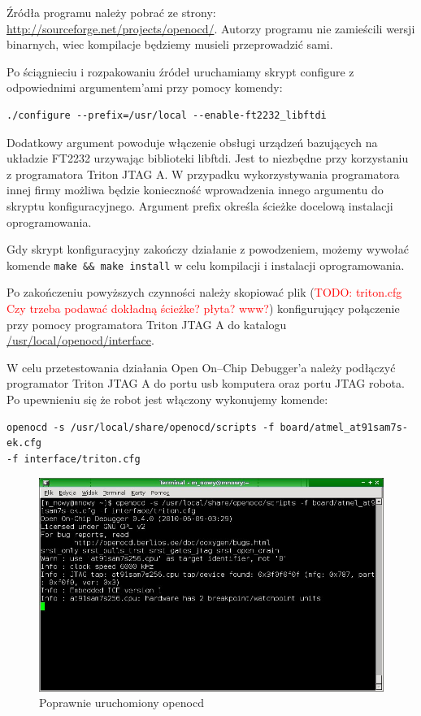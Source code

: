 Źródła programu należy pobrać ze strony:
\url{http://sourceforge.net/projects/openocd/}. Autorzy programu nie zamieścili
wersji binarnych, wiec kompilacje będziemy musieli przeprowadzić sami.

Po ściągnieciu i rozpakowaniu źródeł uruchamiamy skrypt configure z odpowiednimi
argumentem'ami przy pomocy komendy:

\begin{verbatim}
./configure --prefix=/usr/local --enable-ft2232_libftdi 
\end{verbatim}

Dodatkowy argument powoduje włączenie obsługi urządzeń bazujących na układzie
FT2232 urzywając biblioteki libftdi. Jest to niezbędne przy korzystaniu z
programatora Triton JTAG A. W przypadku wykorzystywania programatora innej firmy
możliwa będzie konieczność wprowadzenia innego argumentu do skryptu
konfiguracyjnego. Argument prefix określa ścieżke docelową instalacji
oprogramowania.

Gdy skrypt konfiguracyjny zakończy działanie z powodzeniem, możemy wywołać
komende \verb|make && make install| w celu kompilacji i instalacji
oprogramowania.

Po zakończeniu powyższych czynności należy skopiować plik (\textcolor{red}{TODO:
triton.cfg Czy trzeba podawać dokładną ścieżke? płyta? www?}) konfigurujący
połączenie przy pomocy programatora Triton JTAG A do katalogu
\url{/usr/local/openocd/interface}.

W celu przetestowania działania Open On--Chip Debugger'a należy podłączyć
programator Triton JTAG A do portu usb komputera oraz portu JTAG robota. Po
upewnieniu się że robot jest włączony wykonujemy komende:

\begin{verbatim}
openocd -s /usr/local/share/openocd/scripts -f board/atmel_at91sam7s-ek.cfg
-f interface/triton.cfg 
\end{verbatim}

\begin{figure}
 \centering
 \includegraphics[width=150.0mm]{../images/openocd.jpg}
 \caption{Poprawnie uruchomiony openocd}
 \label{fig:openocd}
\end{figure}

